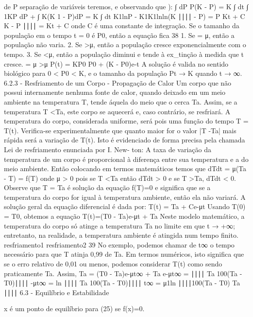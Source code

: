 {{{{{{{{{{{{{de P 
separação de variáveis teremos, e observando que ): 
∫ dP 
P(K - P) = \gamma K 
∫ dt ∫ 1KP dP + ∫ K(K 1 
- P)dP = \gamma K 
∫ dt K1lnP - K1K1lnln(K ∣∣∣∣ - P) = P 
K\gamma t + C 
K - P 
∣∣∣∣ = K\gamma t + C onde C é uma constante de integração. Se o tamanho da população em o tempo t = 0 é P0, então a equação fica 
38 
1. Se \gamma  = μ, então a população não varia. 
2. Se \gamma >μ, então a população cresce exponencialmente com o tempo. 
3. Se \gamma <μ, então a população diminui e tende à ex_{t}inção à medida que t cresce. 
\gamma  = μ 
\gamma >μ 
P(t) = KP0 
P0 + (K - P0)e-\gamma t A solução é valida no sentido biológico para 0 < P0 < K, e o tamanho da população Pt → K quando t → ∞. 
6.2.3 - Resfriamento de um Corpo - Propagação de Calor 
Um corpo que não possui internamente nenhuma fonte de calor, quando deixado em um meio ambiente na temperatura T, tende áquela do meio que o cerca Ta. Assim, se a temperatura T <Ta, este corpo se aquecerá e, caso contrário, se resfriará. 
A temperatura do corpo, considerada uniforme, será pois uma função do tempo T = T(t). Verifica-se experimentalmente que quanto maior for o valor |T -Ta| mais rápida será a variação de T(t). 
Isto é evidenciado de forma precisa pela chamada Lei de resfriamento enunciada por I. New- ton: A taxa de variação da temperatura de um corpo é proporcional à diferença entre sua temperatura e a do meio ambiente. 
Então colocando em termos matemáticos temos que 
dTdt = μ(Ta - T) = f(T) 
onde μ > 0 pois se T <Ta então dTdt > 0 e se T >Ta, dTdt < 0. 
Observe que T = Ta é solução da equação f(T)=0 e significa que se a temperatura do corpo for igual à temperatura ambiente, então ela não variará. 
A solução geral da equação diferencial é dada por: 
T(t) = Ta + Ce-μt 
Usando T(0) = T0, obtemos a equação T(t)=(T0 - Ta)e-μt + Ta Neste modelo matemático, a temperatura do corpo só atinge a temperatura Ta no limite em que t → +∞; entretanto, na realidade, a temperatura ambiente é atingida num tempo finito. 
resfriamento1 
resfriamento2 
39 
No exemplo, podemos chamar de t∞ o tempo necessário para que T atinja 0,99 de Ta. Em termos numéricos, isto significa que se o erro relativo de 0,01 ou menos, podemos considerar T(t) como sendo praticamente Ta. Assim, 
Ta = (T0 - Ta)e-μt∞ + Ta 
e-μt∞ = 
∣∣∣∣ Ta 100(Ta - T0)∣∣∣∣ 
-μt∞ = ln 
∣∣∣∣ Ta 100(Ta - T0)∣∣∣∣ t∞ = μ1ln 
∣∣∣∣100(Ta - T0) Ta 
∣∣∣∣ 
6.3 - Equilíbrio e Estabilidade 

\begin{definition}
x é um ponto de equilíbrio para (25) se f(x)=0. 
\end{definition}

}}}}}}}}}}}}}

